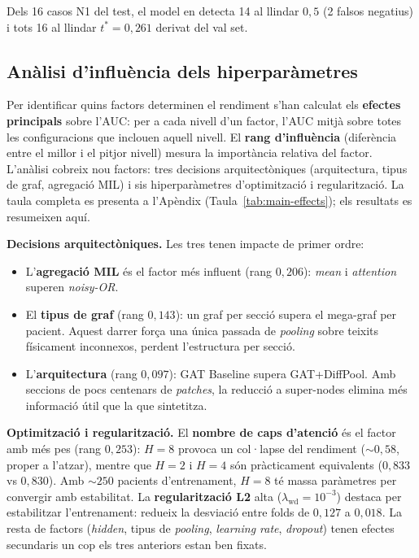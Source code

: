 \documentclass[10pt,a4paper,twocolumn,twoside]{article}
\begin{document}
Dels 16 casos N1 del test, el model en detecta 14 al llindar $0{,}5$ (2 falsos negatius)
i tots 16 al llindar $t^* = 0{,}261$ derivat del val set.

\subsection{Anàlisi d'influència dels hiperparàmetres}
\label{sec:main-effects}

Per identificar quins factors determinen el rendiment s'han calculat els \textbf{efectes
principals} sobre l'AUC: per a cada nivell d'un factor, l'AUC mitjà sobre totes les
configuracions que inclouen aquell nivell. El \textbf{rang d'influència} (diferència entre el
millor i el pitjor nivell) mesura la importància relativa del factor. L'anàlisi cobreix nou
factors: tres decisions arquitectòniques (arquitectura, tipus de graf, agregació MIL) i sis
hiperparàmetres d'optimització i regularització. La taula completa es presenta a l'Apèndix
(Taula~\ref{tab:main-effects}); els resultats es resumeixen aquí.

\textbf{Decisions arquitectòniques.} Les tres tenen impacte de primer ordre:
\begin{itemize}\itemsep0pt
  \item L'\textbf{agregació MIL} és el factor més influent (rang $0{,}206$): \textit{mean}
  i \textit{attention} superen \textit{noisy-OR}.
  \item El \textbf{tipus de graf} (rang $0{,}143$): un graf per secció supera el mega-graf
  per pacient. Aquest darrer força una única passada de \textit{pooling} sobre teixits
  físicament inconnexos, perdent l'estructura per secció.
  \item L'\textbf{arquitectura} (rang $0{,}097$): GAT Baseline supera GAT+DiffPool. Amb
  seccions de pocs centenars de \textit{patches}, la reducció a super-nodes elimina més
  informació útil que la que sintetitza.
\end{itemize}

\textbf{Optimització i regularització.} El \textbf{nombre de caps d'atenció} és el factor
amb més pes (rang $0{,}253$): $H\!=\!8$ provoca un col·lapse del rendiment ($\sim\!0{,}58$,
proper a l'atzar), mentre que $H\!=\!2$ i $H\!=\!4$ són pràcticament equivalents
($0{,}833$ vs $0{,}830$). Amb $\sim\!250$ pacients d'entrenament, $H\!=\!8$ té massa
paràmetres per convergir amb estabilitat. La \textbf{regularització L2} alta
($\lambda_{\text{wd}}\!=\!10^{-3}$) destaca per estabilitzar l'entrenament: redueix la
desviació entre folds de $0{,}127$ a $0{,}018$. La resta de factors (\textit{hidden}, tipus
de \textit{pooling}, \textit{learning rate}, \textit{dropout}) tenen efectes secundaris
un cop els tres anteriors estan ben fixats.
\end{document}
